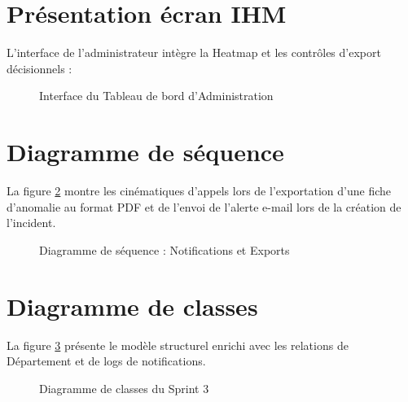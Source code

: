 \section{Présentation écran IHM}
L'interface de l'administrateur intègre la Heatmap et les contrôles d'export décisionnels :

\begin{figure}[H]
    \centering
    \caption{Interface du Tableau de bord d'Administration}
    \label{fig:ihm_admin}
\end{figure}

\section{Diagramme de séquence}
La figure \ref{fig:seq_sprint3} montre les cinématiques d'appels lors de l'exportation d'une fiche d'anomalie au format PDF et de l'envoi de l'alerte e-mail lors de la création de l'incident.

\begin{figure}[H]
    \centering
    \caption{Diagramme de séquence : Notifications et Exports}
    \label{fig:seq_sprint3}
\end{figure}

\section{Diagramme de classes}
La figure \ref{fig:class_sprint3} présente le modèle structurel enrichi avec les relations de Département et de logs de notifications.

\begin{figure}[H]
    \centering
    \caption{Diagramme de classes du Sprint 3}
    \label{fig:class_sprint3}
\end{figure}

